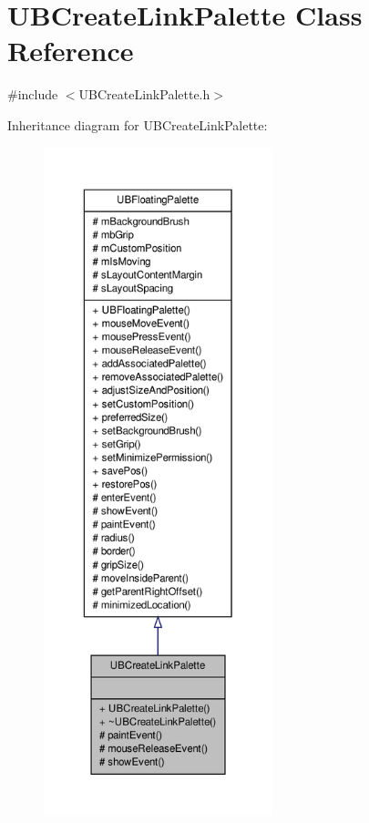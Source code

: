 \hypertarget{class_u_b_create_link_palette}{\section{U\-B\-Create\-Link\-Palette Class Reference}
\label{df/db9/class_u_b_create_link_palette}
}


{\ttfamily \#include $<$U\-B\-Create\-Link\-Palette.\-h$>$}



Inheritance diagram for U\-B\-Create\-Link\-Palette\-:
\nopagebreak
\begin{figure}[H]
\begin{center}
\leavevmode
\includegraphics[height=550pt]{d0/d69/class_u_b_create_link_palette__inherit__graph}
\end{center}
\end{figure}


